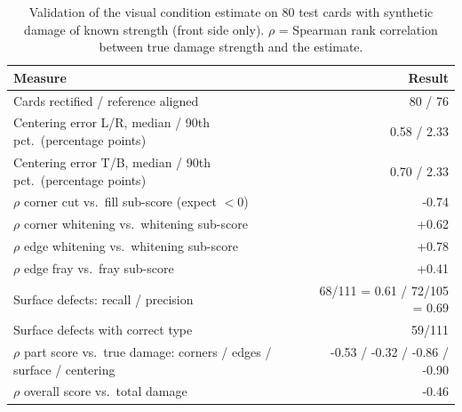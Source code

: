 \begin{table}[htbp]\centering\small
\caption[Condition estimate validation]{Validation of the visual condition estimate on 80 test cards with synthetic damage of known strength (front side only). $\rho$ = Spearman rank correlation between true damage strength and the estimate.}\label{tab:condition}
\begin{tabular}{@{}lr@{}}
\toprule
Measure & Result\\
\midrule
Cards rectified / reference aligned & 80 / 76\\
Centering error L/R, median / 90th pct.\ (percentage points) & 0.58 / 2.33\\
Centering error T/B, median / 90th pct.\ (percentage points) & 0.70 / 2.33\\
$\rho$ corner cut vs.\ fill sub-score (expect $<0$) & -0.74\\
$\rho$ corner whitening vs.\ whitening sub-score & +0.62\\
$\rho$ edge whitening vs.\ whitening sub-score & +0.78\\
$\rho$ edge fray vs.\ fray sub-score & +0.41\\
Surface defects: recall / precision & 68/111 = 0.61 / 72/105 = 0.69\\
Surface defects with correct type & 59/111\\
$\rho$ part score vs.\ true damage: corners / edges / surface / centering & -0.53 / -0.32 / -0.86 / -0.90\\
$\rho$ overall score vs.\ total damage & -0.46\\
\bottomrule
\end{tabular}
\end{table}
